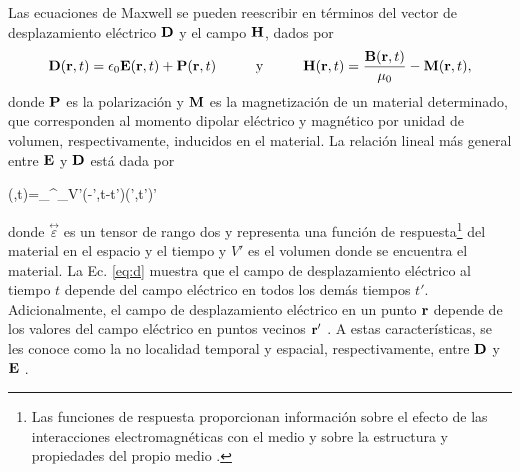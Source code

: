 \noindent Las ecuaciones de Maxwell se pueden reescribir en términos del vector de desplazamiento eléctrico $\vb{D}$ y el campo $\vb{H}$, dados por \cite{griffithsIntroductionElectrodynamics2023}
%
\begin{equation}
	\vb{D}(\vb{r},t)=\epsilon_0\vb{E}(\vb{r},t)+\vb{P}(\vb{r},t) \hspace{1cm}\text{y}\hspace{1cm}
	\vb{H}(\vb{r},t)=\frac{\vb{B}(\vb{r},t)}{\mu_0}-\vb{M}(\vb{r},t), \label{eq:D_H}
\end{equation}
%
donde $\vb{P}$ es la polarización y $\vb{M}$ es la magnetización de un material determinado, que corresponden al momento dipolar eléctrico y magnético por unidad de volumen, respectivamente, inducidos en el material. La relación lineal más general entre $\vb{E}$ y $\vb{D}$ está dada por \cite{jacksonClassicalElectrodynamics2021}
%
\begin{tcolorbox}
	(,t)=\int_{\infty}^{\infty}\int_{V'}\stackrel{\leftrightarrow}{\varepsilon}(-',t-t')\vdot{}(',t')'\
	\label{eq:d} 
\end{tcolorbox}
%	
\noindent donde $\stackrel{\leftrightarrow}{\varepsilon}$ es un tensor de rango dos y representa una función de respuesta\footnote{Las funciones de respuesta proporcionan información sobre el efecto de las interacciones electromagnéticas con el medio y sobre la estructura y propiedades del propio medio \cite{kirzhnitsGeneralPropertiesElectromagnetic1987}.} del material en el espacio y el tiempo \cite{jacksonClassicalElectrodynamics2021} y $V'$ es el volumen donde se encuentra el material. La Ec. \eqref{eq:d} muestra que el campo de desplazamiento eléctrico al tiempo $t$ depende del campo eléctrico en todos los demás tiempos $t'$. Adicionalmente, el campo de desplazamiento eléctrico en un punto $\vb{r}$ depende de los valores del campo eléctrico en puntos vecinos $\vb{r}'$ \cite{jacksonClassicalElectrodynamics2021}. A estas características, se les conoce como la no localidad temporal y espacial, respectivamente, entre $\vb{D}$ y $\vb{E}$ \cite{jacksonClassicalElectrodynamics2021}.

